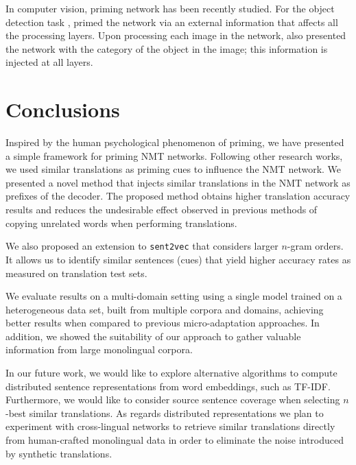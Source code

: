 In computer vision, priming network has been recently studied. For the object detection task , \citet{Rosenfeld18Priming} primed the network via an external information that affects all the processing layers. Upon processing each image in the network, \citet{Rosenfeld18Priming} also presented the network with the category of the object in the image; this information is injected at all layers. 

\section{Conclusions}
\label{sec:conclusions}

Inspired by the human psychological phenomenon of priming, we have presented a simple framework for priming NMT networks.
%
Following other research works, we used similar translations as priming cues to influence the NMT network.
%
We presented a novel method that injects similar translations in the NMT network as prefixes of the decoder.
The proposed method obtains higher translation accuracy results and reduces the undesirable effect observed in previous methods of copying unrelated words when performing translations. 

We also proposed an extension to \texttt{sent2vec} that considers larger $n$-gram orders. It allows us to identify similar sentences (cues) that yield higher accuracy rates as measured on translation test sets.

We evaluate results on a multi-domain setting using a single model trained on a heterogeneous data set, built from multiple corpora and domains, achieving better results when compared to previous micro-adaptation approaches. In addition, we showed the suitability of our approach to gather valuable information from large monolingual corpora. 

In our future work, we would like to explore alternative algorithms to compute distributed sentence representations from word embeddings, such as TF-IDF. Furthermore, we would like to consider source sentence coverage when selecting $n$-best similar translations.
As regards distributed representations we plan to experiment with cross-lingual networks to retrieve similar translations directly from human-crafted monolingual data in order to eliminate the noise introduced by synthetic translations.
